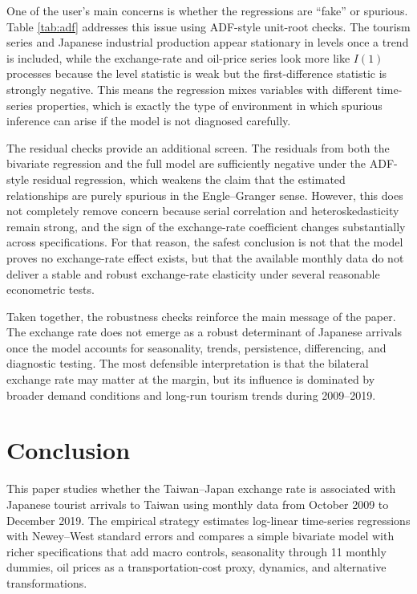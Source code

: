 \documentclass[12pt,a4paper]{article}
\begin{document}
One of the user's main concerns is whether the regressions are ``fake'' or spurious. Table \ref{tab:adf} addresses this issue using ADF-style unit-root checks. The tourism series and Japanese industrial production appear stationary in levels once a trend is included, while the exchange-rate and oil-price series look more like $I(1)$ processes because the level statistic is weak but the first-difference statistic is strongly negative. This means the regression mixes variables with different time-series properties, which is exactly the type of environment in which spurious inference can arise if the model is not diagnosed carefully.

The residual checks provide an additional screen. The residuals from both the bivariate regression and the full model are sufficiently negative under the ADF-style residual regression, which weakens the claim that the estimated relationships are purely spurious in the Engle--Granger sense. However, this does not completely remove concern because serial correlation and heteroskedasticity remain strong, and the sign of the exchange-rate coefficient changes substantially across specifications. For that reason, the safest conclusion is not that the model proves no exchange-rate effect exists, but that the available monthly data do not deliver a stable and robust exchange-rate elasticity under several reasonable econometric tests.

Taken together, the robustness checks reinforce the main message of the paper. The exchange rate does not emerge as a robust determinant of Japanese arrivals once the model accounts for seasonality, trends, persistence, differencing, and diagnostic testing. The most defensible interpretation is that the bilateral exchange rate may matter at the margin, but its influence is dominated by broader demand conditions and long-run tourism trends during 2009--2019.

\section{Conclusion}

This paper studies whether the Taiwan--Japan exchange rate is associated with Japanese tourist arrivals to Taiwan using monthly data from October 2009 to December 2019. The empirical strategy estimates log-linear time-series regressions with Newey--West standard errors and compares a simple bivariate model with richer specifications that add macro controls, seasonality through 11 monthly dummies, oil prices as a transportation-cost proxy, dynamics, and alternative transformations.
\end{document}
